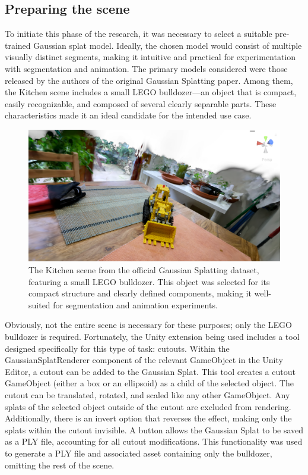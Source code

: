 \documentclass[12pt]{article}
\begin{document}
\subsection{Preparing the scene}
To initiate this phase of the research, it was necessary to select a suitable pre-trained Gaussian splat model. Ideally, the chosen model would consist of multiple visually distinct segments, making it intuitive and practical for experimentation with segmentation and animation. The primary models considered were those released by the authors of the original Gaussian Splatting paper. Among them, the Kitchen scene includes a small LEGO bulldozer—an object that is compact, easily recognizable, and composed of several clearly separable parts. These characteristics made it an ideal candidate for the intended use case.
\begin{figure}[h!]
	\centering
	\includegraphics[width=\textwidth]{Images/Kitchen.png}
	\caption{The Kitchen scene from the official Gaussian Splatting dataset, featuring a small LEGO bulldozer. This object was selected for its compact structure and clearly defined components, making it well-suited for segmentation and animation experiments.}
	\label{fig:kitchen}
\end{figure}
Obviously, not the entire scene is necessary for these purposes; only the LEGO bulldozer is required. Fortunately, the Unity extension being used includes a tool designed specifically for this type of task: cutouts. Within the GaussianSplatRenderer component of the relevant GameObject in the Unity Editor, a cutout can be added to the Gaussian Splat. This tool creates a cutout GameObject (either a box or an ellipsoid) as a child of the selected object. The cutout can be translated, rotated, and scaled like any other GameObject. Any splats of the selected object outside of the cutout are excluded from rendering. Additionally, there is an invert option that reverses the effect, making only the splats within the cutout invisible. A button allows the Gaussian Splat to be saved as a PLY file, accounting for all cutout modifications. This functionality was used to generate a PLY file and associated asset containing only the bulldozer, omitting the rest of the scene.
\end{document}
